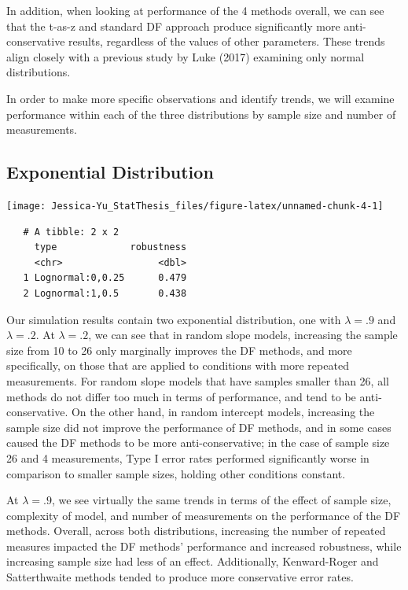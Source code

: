 \documentclass[12pt, twoside]{amherstthesis}
\begin{document}
In addition, when looking at performance of the 4 methods overall, we can see that the t-as-z and standard DF approach produce significantly more anti-conservative results, regardless of the values of other parameters. These trends align closely with a previous study by Luke (2017) examining only normal distributions.

In order to make more specific observations and identify trends, we will examine performance within each of the three distributions by sample size and number of measurements.

\hypertarget{exponential-distribution}{%
\subsection{Exponential Distribution}\label{exponential-distribution}}
\begin{center}\texttt{[image: Jessica-Yu\_StatThesis\_files/figure-latex/unnamed-chunk-4-1]} \end{center}
\begin{verbatim}
   # A tibble: 2 x 2
     type             robustness
     <chr>                 <dbl>
   1 Lognormal:0,0.25      0.479
   2 Lognormal:1,0.5       0.438
\end{verbatim}
Our simulation results contain two exponential distribution, one with \(\lambda = .9\) and \(\lambda = .2\). At \(\lambda = .2\), we can see that in random slope models, increasing the sample size from 10 to 26 only marginally improves the DF methods, and more specifically, on those that are applied to conditions with more repeated measurements. For random slope models that have samples smaller than 26, all methods do not differ too much in terms of performance, and tend to be anti-conservative. On the other hand, in random intercept models, increasing the sample size did not improve the performance of DF methods, and in some cases caused the DF methods to be more anti-conservative; in the case of sample size 26 and 4 measurements, Type I error rates performed significantly worse in comparison to smaller sample sizes, holding other conditions constant.

At \(\lambda = .9\), we see virtually the same trends in terms of the effect of sample size, complexity of model, and number of measurements on the performance of the DF methods. Overall, across both distributions, increasing the number of repeated measures impacted the DF methods' performance and increased robustness, while increasing sample size had less of an effect. Additionally, Kenward-Roger and Satterthwaite methods tended to produce more conservative error rates.
\end{document}
